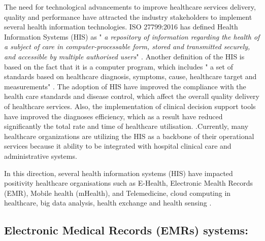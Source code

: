 
The need for technological advancements to improve healthcare services delivery, quality and performance have attracted the industry stakeholders to implement  several health information technologies. ISO 27799:2016 has defined Health Information Systems (HIS) as " \textit{a repository of information regarding the health of a subject of care in computer-processable form, stored and transmitted securely, and accessible by multiple authorised users}" \cite{TheInternationalOrganizationforStandardization2016}. Another definition of the HIS is based on the fact that it is a computer program, which  includes " a set of standards based on healthcare diagnosis, symptoms, cause, healthcare target and measurements" \cite{Pai2011}. The adoption of HIS have improved the compliance with the health care standards and disease control, which affect the overall quality delivery of healthcare services. Also, the implementation of clinical decision support tools have improved the diagnoses efficiency, which as a result have reduced significantly the total rate and time of healthcare utilisation. \cite{Care2006,Akowuah2013}.Currently, many healthcare organizations are utilizing the HIS as a backbone of their operational services because it ability to be integrated with hospital clinical care and administrative systems\cite{Rahim2016}.   

In this direction, several health information systems (HIS) have impacted positivity healthcare organisations such as E-Health, Electronic Mealth Records (EMR), Mobile health (mHealth),
and Telemedicine, cloud computing in healthcare, big data analysis, health exchange and health sensing \cite{WorldHealthOrganization2016,Yang2015}. 


\subsection{Electronic Medical Records (EMRs) systems:}

